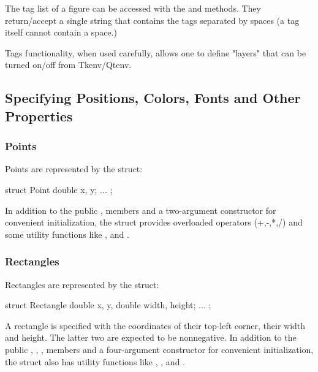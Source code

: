 The tag list of a figure can be accessed with the  and
  methods. They return/accept a single
string that contains the tags separated by spaces (a tag itself cannot
contain a space.)

Tags functionality, when used carefully, allows one to define "layers"
that can be turned on/off from Tkenv/Qtenv.


\subsection{Specifying Positions, Colors, Fonts and Other Properties}
\label{sec:graphics:figure-positions-colors-fonts-etc}

\subsubsection{Points}
\label{sec:graphics:canvas-points}

Points are represented by the  struct:

\begin{cpp}
struct Point {
    double x, y;
    ...
};
\end{cpp}

In addition to the public ,  members and a two-argument
constructor for convenient initialization, the struct provides overloaded
operators (+,-,*,/) and some utility functions like ,
 and .

\subsubsection{Rectangles}
\label{sec:graphics:canvas-rectangles}

Rectangles are represented by the  struct:

\begin{cpp}
struct Rectangle {
    double x, y,
    double width, height;
    ...
};
\end{cpp}

A rectangle is specified with the coordinates of their top-left corner,
their width and height. The latter two are expected to be nonnegative. In
addition to the public , , ,  members
and a four-argument constructor for convenient initialization, the struct
also has utility functions like , ,
 and .

